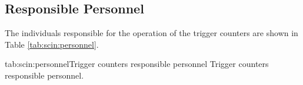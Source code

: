 \begin{safetyen}{0}{0}
\subsection{Responsible Personnel}

The individuals responsible for the operation 
of the trigger counters are shown in Table \ref{tab:scin:personnel}.

\begin{namestab}{tab:scin:personnel}{Trigger counters responsible personnel} {%
      Trigger counters responsible personnel.}
  \JackSegal{}
\end{namestab}
\end{safetyen}
